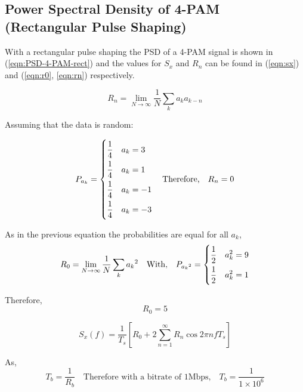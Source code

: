 \subsection{Power Spectral Density of 4-PAM (Rectangular Pulse Shaping)}

With a rectangular pulse shaping the PSD of a 4-PAM signal is shown in (\ref{eqn:PSD-4-PAM-rect}) and the values for $S_x$ 
and $R_n$ can be found in (\ref{eqn:sx}) and (\ref{eqn:r0}, \ref{eqn:rn}) respectively.

\begin{equation}
    \label{eqn:rn}
    R_n=\lim_{N\to\infty} \frac{1}{N} \sum_{k}a_k a_{k-n}
\end{equation}

Assuming that the data is random:

\begin{equation}
    \label{eqn:ak-dist}
    P_{a_k} = 
    \begin{dcases}
        \frac{1}{4} \quad a_k = 3 \\
        \frac{1}{4} \quad a_k = 1 \\
        \frac{1}{4} \quad a_k = -1 \\
        \frac{1}{4} \quad a_k = -3
    \end{dcases}
    \quad \textrm{Therefore,} \quad R_n = 0
\end{equation}

As in the previous equation the probabilities are equal for all $a_k$,
\begin{equation}
    \label{eqn:r0}
    R_0 = \lim_{N\to\infty} \frac{1}{N} \sum_{k} {a_{k}}^2 \quad \textrm{With,} \quad P_{{a_{k}}^2} = 
    \begin{dcases}
        \frac{1}{2} \quad a_k^2 = 9 \\
        \frac{1}{2} \quad a_k^2 = 1
    \end{dcases}
\end{equation}

\newpage

Therefore,
\begin{equation}
    \label{eqn:r0-value}
    R_0 = 5
\end{equation}

\begin{equation}
    \label{eqn:sx}
     S_x(f) = \frac{1}{T_s}[R_0 + 2 \sum_{n=1}^{\infty}{R_n \cos 2 \pi n f T_s}]
\end{equation}

As,
\begin{equation}
    \label{eqn:ts}
    T_b = \frac{1}{R_b} \quad \textrm{Therefore with a bitrate of 1Mbps,} \quad T_b = \frac{1}{1 \times 10^6}
\end{equation}

